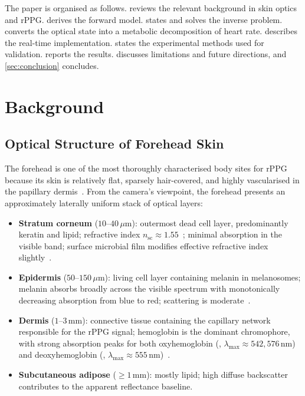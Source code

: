\documentclass[10pt,twocolumn,a4paper]{article}
\theoremstyle{definition}
\newcommand{\Hb}{\mathrm{Hb}}
\newcommand{\HbO}{\mathrm{HbO_2}}
\begin{document}
The paper is organised as follows.
 reviews the relevant background in skin optics
and rPPG.
 derives the forward model.
 states and solves the inverse problem.
 converts the optical state into a metabolic
decomposition of heart rate.
 describes the real-time implementation.
 states the experimental methods used for
validation.
 reports the results.
 discusses limitations and future directions, and
\cref{sec:conclusion} concludes.

\section{Background}\label{sec:background}

\subsection{Optical Structure of Forehead Skin}\label{ssec:skin}

The forehead is one of the most thoroughly characterised body sites
for rPPG because its skin is relatively flat, sparsely
hair-covered, and highly vascularised in the papillary
dermis~\cite{anderson1981skin,jacques2013}. From the camera's
viewpoint, the forehead presents an approximately laterally uniform
stack of optical layers:

\begin{itemize}[leftmargin=*,nosep]
\item \textbf{Stratum corneum} ($10$--$40\,\mu$m): outermost dead
  cell layer, predominantly keratin and lipid; refractive index
  $n_{\mathrm{sc}}\approx 1.55$~\cite{tuchin2007}; minimal absorption
  in the visible band; surface microbial film modifies effective
  refractive index slightly~\cite{prescott2017}.
\item \textbf{Epidermis} ($50$--$150\,\mu$m): living cell layer
  containing melanin in melanosomes; melanin absorbs broadly across
  the visible spectrum with monotonically decreasing absorption from
  blue to red; scattering is moderate~\cite{jacques1998melanin}.
\item \textbf{Dermis} ($1$--$3\,\mathrm{mm}$): connective tissue
  containing the capillary network responsible for the rPPG signal;
  hemoglobin is the dominant chromophore, with strong absorption peaks
  for both oxyhemoglobin (\HbO, $\lambda_{\max}\approx
  542,576\,\mathrm{nm}$) and deoxyhemoglobin (\Hb,
  $\lambda_{\max}\approx
  555\,\mathrm{nm}$)~\cite{prahlomlc,zijlstra2000}.
\item \textbf{Subcutaneous adipose} ($\geq 1\,\mathrm{mm}$): mostly
  lipid; high diffuse backscatter contributes to the apparent
  reflectance baseline.
\end{itemize}
\end{document}

